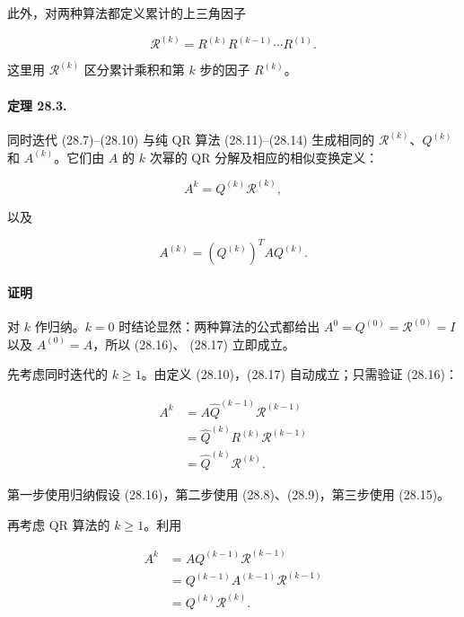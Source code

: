 \documentclass[UTF8,fontset=none,12pt]{ctexart}
\begin{document}
此外，对两种算法都定义累计的上三角因子

\begin{equation}
 \mathcal R^{(k)}=R^{(k)}R^{(k-1)}\cdots R^{(1)}.
\tag{28.15}
\end{equation}

这里用 $\mathcal R^{(k)}$ 区分累计乘积和第 $k$ 步的因子 $R^{(k)}$。

\paragraph{定理 28.3.}
同时迭代 (28.7)–(28.10) 与纯 QR 算法 (28.11)–(28.14) 生成相同的
$\mathcal R^{(k)}$、$Q^{(k)}$ 和 $A^{(k)}$。它们由 $A$ 的 $k$ 次幂的
QR 分解及相应的相似变换定义：

\begin{equation}
 A^k=Q^{(k)}\mathcal R^{(k)},
\tag{28.16}
\end{equation}

以及

\begin{equation}
 A^{(k)}=(Q^{(k)})^TAQ^{(k)}.
\tag{28.17}
\end{equation}

\paragraph{证明}
对 $k$ 作归纳。$k=0$ 时结论显然：两种算法的公式都给出
$A^0=Q^{(0)}=\mathcal R^{(0)}=I$ 以及 $A^{(0)}=A$，所以 (28.16)、
(28.17) 立即成立。

先考虑同时迭代的 $k\ge1$。由定义 (28.10)，(28.17) 自动成立；只需验证
(28.16)：

\[
\begin{aligned}
A^k
 &=A\widehat Q^{(k-1)}\mathcal R^{(k-1)}\\
 &=\widehat Q^{(k)}R^{(k)}\mathcal R^{(k-1)}\\
 &=\widehat Q^{(k)}\mathcal R^{(k)}.
\end{aligned}
\]

第一步使用归纳假设 (28.16)，第二步使用 (28.8)、(28.9)，第三步使用
(28.15)。

再考虑 QR 算法的 $k\ge1$。利用

\[
\begin{aligned}
A^k
 &=AQ^{(k-1)}\mathcal R^{(k-1)}\\
 &=Q^{(k-1)}A^{(k-1)}\mathcal R^{(k-1)}\\
 &=Q^{(k)}\mathcal R^{(k)}.
\end{aligned}
\]
\end{document}
